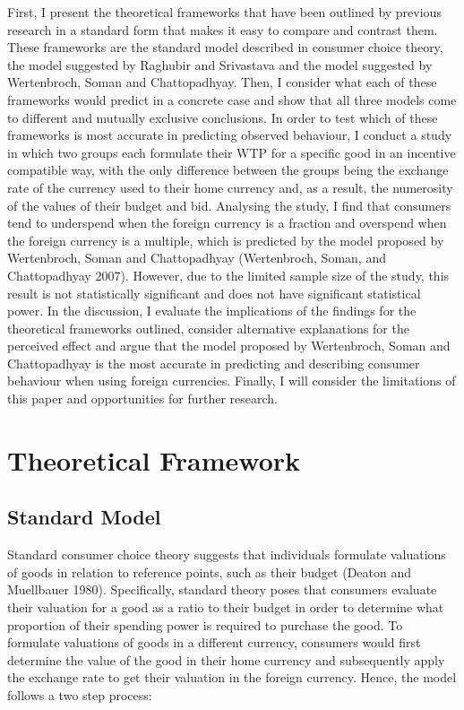 \documentclass[
]{report}
\begin{document}
First, I present the theoretical frameworks that have been outlined by
previous research in a standard form that makes it easy to compare and
contrast them. These frameworks are the standard model described in
consumer choice theory, the model suggested by Raghubir and Srivastava
and the model suggested by Wertenbroch, Soman and Chattopadhyay. Then, I
consider what each of these frameworks would predict in a concrete case
and show that all three models come to different and mutually exclusive
conclusions. In order to test which of these frameworks is most accurate
in predicting observed behaviour, I conduct a study in which two groups
each formulate their WTP for a specific good in an incentive compatible
way, with the only difference between the groups being the exchange rate
of the currency used to their home currency and, as a result, the
numerosity of the values of their budget and bid. Analysing the study, I
find that consumers tend to underspend when the foreign currency is a
fraction and overspend when the foreign currency is a multiple, which is
predicted by the model proposed by Wertenbroch, Soman and Chattopadhyay
(Wertenbroch, Soman, and Chattopadhyay 2007). However, due to the
limited sample size of the study, this result is not statistically
significant and does not have significant statistical power. In the
discussion, I evaluate the implications of the findings for the
theoretical frameworks outlined, consider alternative explanations for
the perceived effect and argue that the model proposed by Wertenbroch,
Soman and Chattopadhyay is the most accurate in predicting and
describing consumer behaviour when using foreign currencies. Finally, I
will consider the limitations of this paper and opportunities for
further research.

\chapter{Theoretical Framework}\label{theoretical-framework}

\section{Standard Model}\label{standard-model}

Standard consumer choice theory suggests that individuals formulate
valuations of goods in relation to reference points, such as their
budget (Deaton and Muellbauer 1980). Specifically, standard theory poses
that consumers evaluate their valuation for a good as a ratio to their
budget in order to determine what proportion of their spending power is
required to purchase the good. To formulate valuations of goods in a
different currency, consumers would first determine the value of the
good in their home currency and subsequently apply the exchange rate to
get their valuation in the foreign currency. Hence, the model follows a
two step process:
\end{document}

